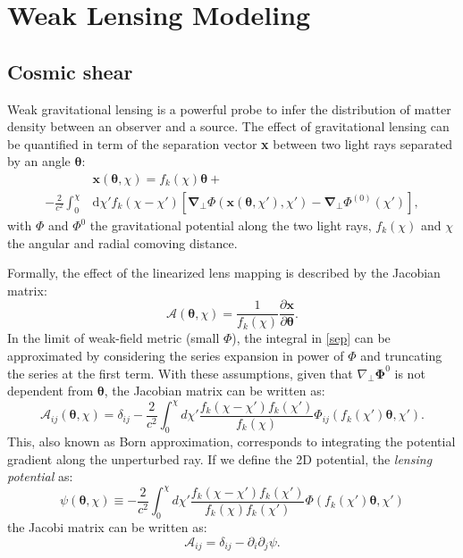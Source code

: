 \documentclass{aa}
\begin{document}

\section{Weak Lensing Modeling}\label{weak_lesning_modeling}
\subsection{{Cosmic shear}}
Weak gravitational lensing is a powerful probe to infer the distribution of matter density between an observer and a source.
The effect of gravitational lensing 
can be quantified in term of the separation vector \textbf{x} between two light rays separated by an angle $\boldsymbol{\theta}$:
\begin{align}\label{sep}
   & \textbf{x}(\boldsymbol{\theta},\chi) =
    f_k(\chi)\boldsymbol{\theta} + \\
   - \frac{2}{c^2}
   \int_0^{\chi}
    &  \text{d}\chi'
    f_k(\chi-\chi')
    [ \boldsymbol{\nabla_{\bot}}\Phi( \textbf{x}(\boldsymbol{\theta},\chi'),\chi')-
    \boldsymbol{\nabla_{\bot}}\Phi^{(0)}(\chi')
    ],
\end{align}
with $\Phi$ and $\Phi^{0}$ the gravitational potential along the two light rays, $f_k(\chi)$ and $\chi$ the angular and radial comoving distance.

Formally, the effect of the linearized lens mapping is described by the Jacobian matrix:
\begin{equation}
\mathcal{A}(\boldsymbol{\theta},\chi)=
\frac{1}{f_{k}(\chi)}
\frac{\partial \textbf{x}}{\partial \boldsymbol{\theta}}.
\end{equation}
In the limit of weak-field metric (small $\Phi$), the integral in \autoref{sep} can be approximated by considering the series expansion in power of $\Phi$ and truncating the series at the first term.
With these assumptions, given that $\nabla_{\bot}\boldsymbol{\Phi}^0$ is not dependent from $\boldsymbol{\theta}$, the Jacobian matrix can be written as:
\begin{equation}
    \mathcal{A}_{ij}(\boldsymbol{\theta},\chi)
     =\delta_{ij}-\frac{2}{c^2}
    \int_0^{\chi} d\chi'
     \frac{f_k(\chi-\chi')f_k(\chi')}{f_k(\chi)}
     \Phi_{ij}(f_k(\chi')\boldsymbol{\theta},\chi').
\end{equation}
This, also known as Born approximation, corresponds to integrating the potential gradient along the unperturbed ray.
If we define the 2D potential, the \textit{lensing potential} as:
\begin{equation}
    \psi(\boldsymbol{\theta},\chi) \equiv
 -\frac{2}{c^2}
 \int_0^{\chi} d\chi'
   \frac{f_k(\chi-\chi')f_k(\chi')}{f_k(\chi)f_k(\chi')}
  \Phi(f_k(\chi')\boldsymbol{\theta},\chi')
\end{equation}
 the Jacobi matrix can be written as:
\begin{equation}
    \mathcal{A}_{ij}=\delta_{ij}-\partial_i \partial_j\psi.
\end{equation}
\end{document}
